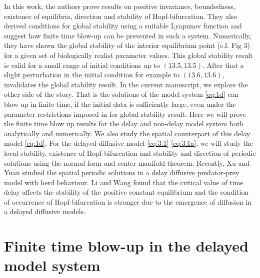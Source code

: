 \documentclass[10pt]{amsart}
\theoremstyle{definition}
\begin{document}
In this work, the authors \cite{RK15} prove results on positive invariance, boundedness, existence of equilibria, direction and stability of Hopf-bifurcation. They also derived conditions for global stability using a suitable Lyapunov function and suggest how finite time blow-up can be prevented in such a system. Numerically, they have shown the global stability  of the interior equilibrium  point (c.f. Fig 3) for a given set of biologically realist parameter values. This global stability result is valid for a small range of initial conditions up to $(13.5, 13.5)$. After that a slight perturbation in the initial condition for example to $(13.6, 13.6)$, invalidates the global stability result. In the current manuscript, we explore the other side of the story. That is the solutions of the model system \eqref{eq:1d} can blow-up in finite time, if the initial data is sufficiently large, even under the parameter restrictions imposed in \cite{RK15} for global stability result.  Here we will prove the finite time blow up results for the delay and non-delay model system both analytically and numerically. We also study the spatial counterpart of this delay model \eqref{eq:1d}. For the delayed diffusive model \eqref{eq:3.1}-\eqref{eq:3.1a}, we will study the local stability, existence of Hopf-bifurcation and stability and direction of periodic solutions using the normal form and center manifold theorem. Recently, Xu and Yuan \cite{XY15} studied the spatial periodic solutions in a delay diffusive predator-prey model with herd behaviour. Li and Wang \cite{LW15} found that the critical value of time delay affects the stability of the positive constant equilibrium and the condition of occurrence of Hopf-bifurcation is stronger due to the emergence of diffusion in a delayed diffusive models.
 

\section{Finite time blow-up in the delayed model system}

\label{thm:u1}
\end{document}

